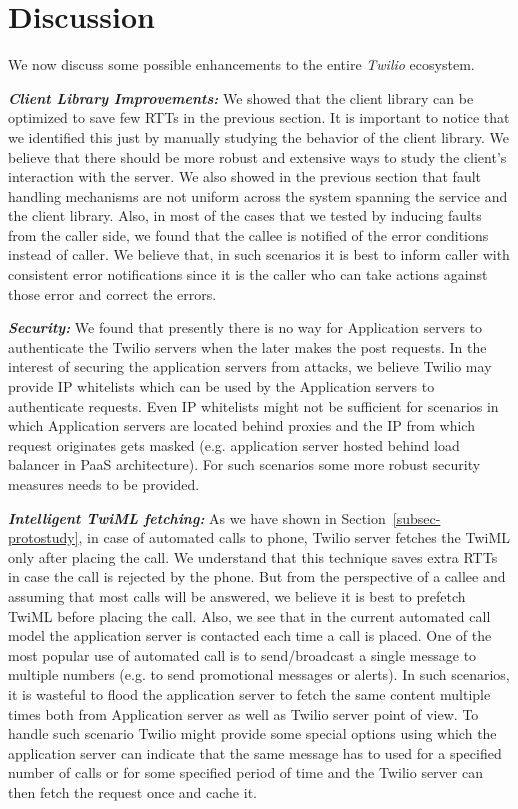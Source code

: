 \section{Discussion}
\label{sec-discussion}
We now discuss some possible enhancements to the entire \textit{Twilio} ecosystem. 

\emph{\textbf{Client Library Improvements:}}
We showed that the client library can be optimized to save few RTTs in the previous section. It is important to notice that we identified this just by manually studying the behavior of the client library. We believe that there should be more robust and extensive ways to study the client's interaction with the server. We also showed in the previous section that fault handling mechanisms are not uniform across the system spanning the service and the client library. Also, in most of the cases that we tested by inducing faults from the caller side, we found that the callee is notified of the error conditions instead of caller. We believe that, in such scenarios it is best to inform caller with consistent error notifications since it is the caller who can take actions against those error and correct the errors.


\emph{\textbf{Security:}} We found that presently there is no way for Application servers to authenticate the Twilio servers when the later makes the post requests. In the interest of securing the application servers from attacks, we believe Twilio may provide IP whitelists which can be used by the Application servers to authenticate requests. Even IP whitelists might not be sufficient for scenarios in which Application servers are located behind proxies and the IP from which request originates gets masked (e.g. application server hosted behind load balancer in PaaS architecture). For such scenarios some more robust security measures needs to be provided.

\emph{\textbf{Intelligent TwiML fetching:}} As we have shown in Section~\ref{subsec-protostudy}, in case of automated calls to phone, Twilio server fetches the TwiML only after placing the call. We understand that this technique saves extra RTTs in case the call is rejected by the phone. But from the perspective of a callee and assuming that most calls will be answered, we believe it is best to prefetch TwiML before placing the call. Also, we see that in the current automated call model the application server is contacted each time a call is placed. One of the most popular use of automated call is to send/broadcast a single message to multiple numbers (e.g. to send promotional messages or alerts). In such scenarios, it is wasteful to flood the application server to fetch the same content multiple times both from Application server as well as Twilio server point of view. To handle such scenario Twilio might provide some special options using which the application server can indicate that the same message has to used for a specified number of calls or for some specified period of time and the Twilio server can then fetch the request once and cache it.   
 